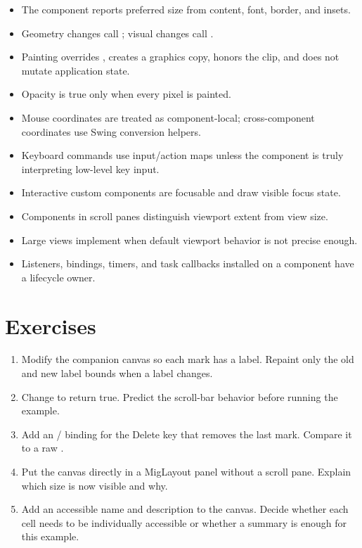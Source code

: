 \begin{itemize}
\item The component reports preferred size from content, font, border, and insets.
\item Geometry changes call ; visual changes call .
\item Painting overrides , creates a graphics copy, honors the clip, and does not mutate application state.
\item Opacity is true only when every pixel is painted.
\item Mouse coordinates are treated as component-local; cross-component coordinates use Swing conversion helpers.
\item Keyboard commands use input/action maps unless the component is truly interpreting low-level key input.
\item Interactive custom components are focusable and draw visible focus state.
\item Components in scroll panes distinguish viewport extent from view size.
\item Large views implement  when default viewport behavior is not precise enough.
\item Listeners, bindings, timers, and task callbacks installed on a component have a lifecycle owner.
\end{itemize}

\section{Exercises}

\begin{exercisebox}
\begin{enumerate}
\item Modify the companion canvas so each mark has a label. Repaint only the old and new label bounds when a label changes.
\item Change  to return true. Predict the scroll-bar behavior before running the example.
\item Add an / binding for the Delete key that removes the last mark. Compare it to a raw .
\item Put the canvas directly in a MigLayout panel without a scroll pane. Explain which size is now visible and why.
\item Add an accessible name and description to the canvas. Decide whether each cell needs to be individually accessible or whether a summary is enough for this example.
\end{enumerate}
\end{exercisebox}
